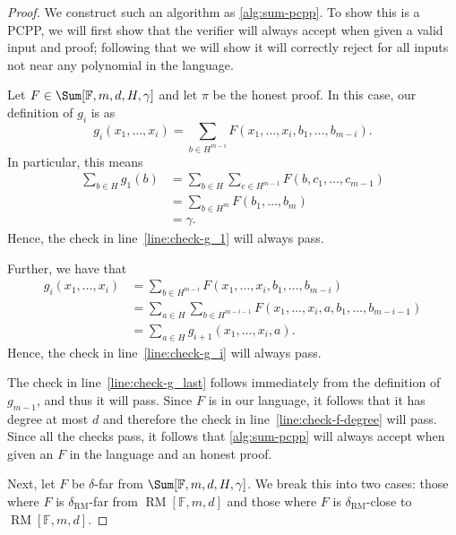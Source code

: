 \documentclass[english,12pt]{reedthesis}
\theoremstyle{plain}
\theoremstyle{definition}
\theoremstyle{remark}
\DeclareMathOperator{\RM}{RM}
\begin{document}
\begin{proof}
  We construct such an algorithm as \cref{alg:sum-pcpp}. To show this is a PCPP,
  we will first show that the verifier will always accept when given a valid
  input and proof; following that we will show it will correctly reject for all
  inputs not near any polynomial in the language.

  Let $F \in \Sum[\mathbb{F}, m, d, H, \gamma]$ and let $\pi$ be the honest proof. In
  this case, our definition of $g_{i}$ is as
  \begin{equation}
    g_{i}(x_{1}, \ldots, x_{i}) = \sum_{b \in H^{m-i}}F(x_{1}, \ldots, x_{i}, b_{1}, \ldots, b_{m-i}).
  \end{equation}
  In particular, this means
  \begin{align*}
    \sum_{b \in H}g_{1}(b) &= \sum_{b \in H}\sum_{c \in H^{m-1}}F(b, c_{1}, \ldots, c_{m-1}) \\
                      &= \sum_{b \in H^{m}}F(b_{1}, \ldots, b_{m}) \\
                      &= \gamma.
  \end{align*}
  Hence, the check in line~\ref{line:check-g_1} will always pass.

  Further, we have that
  \begin{align*}
    g_{i}(x_{1}, \ldots, x_{i}) &= \sum_{b \in H^{m-i}}F(x_{1}, \ldots, x_{i}, b_{1}, \ldots, b_{m-i}) \\
                           &= \sum_{a \in H}\sum_{b \in H^{m-i-1}}F(x_{1}, \ldots, x_{i}, a, b_{1}, \ldots, b_{m-i-1}) \\
                           &= \sum_{a \in H}g_{i+1}(x_{1}, \ldots, x_{i}, a).
  \end{align*}
  Hence, the check in line~\ref{line:check-g_i} will always pass.

  The check in line~\ref{line:check-g_last} follows immediately from the
  definition of $g_{m-1}$, and thus it will pass. Since $F$ is in our language,
  it follows that it has degree at most $d$ and therefore the check in
  line~\ref{line:check-f-degree} will pass. Since all the checks pass, it
  follows that \cref{alg:sum-pcpp} will always accept when given an $F$ in the
  language and an honest proof.

  Next, let $F$ be $\delta$-far from $\Sum[\mathbb{F}, m, d, H, \gamma]$. We break this
  into two cases: those where $F$ is $\delta_{\RM}$-far from $\RM[\mathbb{F}, m, d]$
  and those where $F$ is $\delta_{\RM}$-close to $\RM[\mathbb{F}, m, d]$.


\end{proof}
\end{document}
